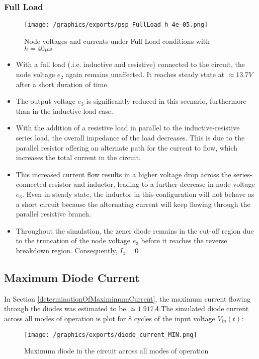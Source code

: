 \subsubsection{Full Load}
\begin{figure}[H]
    \centering
    \texttt{[image: /graphics/exports/psp\_FullLoad\_h\_4e-05.png]}
    \caption{Node voltages and currents under Full Load conditions with $h=40\mu s$}
\end{figure}
\begin{itemize}
	\item With a full load (.i.e. inductive and resistive) connected to the circuit, the node voltage $e_2$ again remains unaffected. It reaches steady state at $\approx 13.7V$ after a short duration of time.
	\item The output voltage $e_3$ is significantly reduced in this scenario, furthermore than in the inductive load case. 
	\item With the addition of a resistive load in parallel to the inductive-resistive series load, the overall impedance of the load decreases. This is due to the parallel resistor offering an alternate path for the current to flow, which increases the total current in the circuit.
	\item This increased current flow results in a higher voltage drop across the series-connected resistor and inductor, leading to a further decrease in node voltage $e_3$. Even in steady state, the inductor in this configuration will not behave as a short circuit because the alternating current will keep flowing through the parallel resistive branch.
	\item Throughout the simulation, the zener diode remains in the cut-off region due to the truncation of the node voltage $e_3$ before it reaches the reverse breakdown region. Consequently, $I_z=0$
\end{itemize}

\pagebreak
\subsection{Maximum Diode Current}
In Section \ref{determinationOfMaximimumCurrent}, the maximum current flowing through the diodes was estimated to be $\simeq 1.917A$.The simulated diode current across all modes of operation is plot for 8 cycles of the input voltage $V_{in}(t)$:
\begin{figure}[H]
	\centering
	\texttt{[image: /graphics/exports/diode\_current\_MIN.png]}
	\caption{Maximum diode in the circuit across all modes of operation}
\end{figure}

